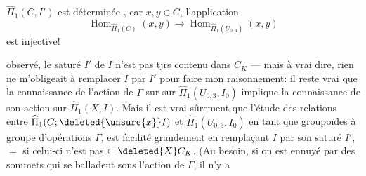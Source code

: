 $\widehat\Pi_1(C,I')$ est déterminée , car  $x,y\in C$, l'application
\[
\operatorname{Hom}_{\widehat\Pi_1(C)}(x,y)\longrightarrow\operatorname{Hom}_{\widehat\Pi_1(U_{0,3})}(x,y)
\]
est injective!

  observé,  le saturé $I'$ de $I$  n'est pas tjrs  contenu dans  $C_K$ --- mais à vrai dire, rien ne m'obligeait à remplacer $I$ par $I'$ pour faire mon raisonnement: il reste vrai que la connaissance de l'action de $\Gamma$ sur sur $\widehat\Pi_1(U_{0,3},I_0)$ implique la connaissance de son action sur $\widehat\Pi_1(X,I)$. Mais il est vrai sûrement que l'étude des relations entre $\widehat\Pi_1(C;\deleted{\unsure{x}}I)$ et $\widehat\Pi_1(U_{0,3},I_0)$ en tant que groupoïdes à groupe d'opérations $\Gamma$, est facilité grandement en remplaçant $I$ par son saturé $I'$, $=$ si celui-ci n'est pas $\subset\deleted{X}C_K$. (Au besoin, si on est ennuyé par des sommets qui se balladent sous l'action de $\Gamma$, il n'y a

